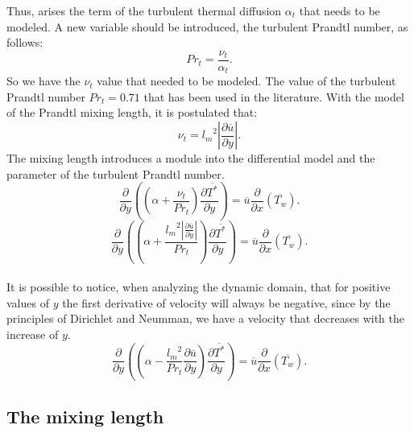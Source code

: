 \documentclass[10pt]{article} %
\begin{document}
Thus, arises the term of the turbulent thermal diffusion $\alpha_t$ that needs to be modeled. A new variable should be introduced, the turbulent Prandtl number, as follows:
\begin{equation}
Pr_t = \frac{\nu_t}{\alpha_t}.
\end{equation} 
So we have the $ \nu_t $ value that needed to be modeled. The value of the turbulent Prandtl number $ Pr_t = 0.71 $ that has been used in the literature.
With the model of the Prandtl mixing length, it is postulated that:
\begin{equation}
\nu_t = {l_m}^2 \left| \frac{\partial \overline{u}}{\partial y} \right|.
\end{equation}
The mixing length introduces a module into the differential model and the parameter of the turbulent Prandtl number.
\\
\begin{equation}
{\frac{\partial{}}{\partial{y}}} \left( \left( \alpha   
+ \frac{\nu_t}{Pr_t} \right) \frac{\partial \overline{T^\ast}}{\partial y} \right)
= 
\overline{u}\frac{\partial{}}{\partial{x}}\left(\overline{T_w}\right)  .
\end{equation}
\begin{equation}
{\frac{\partial{}}{\partial{y}}} \left( \left( \alpha   
+ \frac{{l_m}^2 \left| \frac{\partial \overline{u}}{\partial y} \right|}{Pr_t} \right) \frac{\partial \overline{T^\ast}}{\partial y} \right)
= 
\overline{u}\frac{\partial{}}{\partial{x}}\left(\overline{T_w}\right)  .
\end{equation}
\\

It is possible to notice, when analyzing the dynamic domain, that for positive values of $ y $ the first derivative of velocity will always be negative, since by the principles of Dirichlet and Neumman, we have a velocity that decreases with the increase of $ y $.\\
\begin{equation}
{\frac{\partial{}}{\partial{y}}} \left( \left( \alpha   
- \frac{{l_m}^2}{Pr_t}\frac{\partial \overline{u}}{\partial y} \right) \frac{\partial \overline{T^\ast}}{\partial y} \right)
= 
\overline{u}\frac{\partial{}}{\partial{x}}\left(\overline{T_w}\right)  .
\end{equation}



\subsection{The mixing length}
\end{document}
